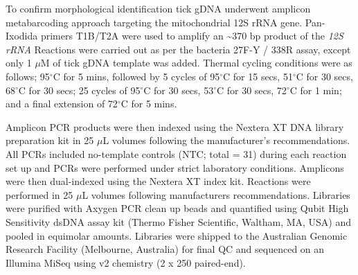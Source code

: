 \documentclass[a4paper, nobind]{templates/ociamthesis}
\begin{document}
To confirm morphological identification tick gDNA underwent amplicon metabarcoding approach targeting the mitochondrial 12S rRNA gene.
Pan-Ixodida primers T1B/T2A \autocite{beatiAnalysisSystematicRelationships2001} were used to amplify an \textasciitilde370 bp product of the \emph{12S rRNA}
Reactions were carried out as per the bacteria 27F-Y / 338R assay, except only 1 \(\mu\)M of tick gDNA template was added.
Thermal cycling conditions were as follows; 95\(^\circ\)C for 5 mins, followed by 5 cycles of 95\(^\circ\)C for 15 secs, 51\(^\circ\)C for 30 secs, 68\(^\circ\)C for 30 secs; 25 cycles of 95\(^\circ\)C for 30 secs, 53\(^\circ\)C for 30 secs, 72\(^\circ\)C for 1 min; and a final extension of 72\(^\circ\)C for 5 mins.

Amplicon PCR products were then indexed using the Nextera XT DNA library preparation kit in 25 \(\mu\)L volumes following the manufacturer's recommendations.
All PCRs included no-template controls (NTC; total = 31) during each reaction set up and PCRs were performed under strict laboratory conditions.
Amplicons were then dual-indexed using the Nextera XT index kit.
Reactions were performed in 25 \(\mu\)L volumes following manufacturers recommendations.
Libraries were purified with Axygen PCR clean up beads and quantified using Qubit High Sensitivity dsDNA assay kit (Thermo Fisher Scientific, Waltham, MA, USA) and pooled in equimolar amounts.
Libraries were shipped to the Australian Genomic Research Facility (Melbourne, Australia) for final QC and sequenced on an Illumina MiSeq using v2 chemistry (2 x 250 paired-end).
\end{document}
